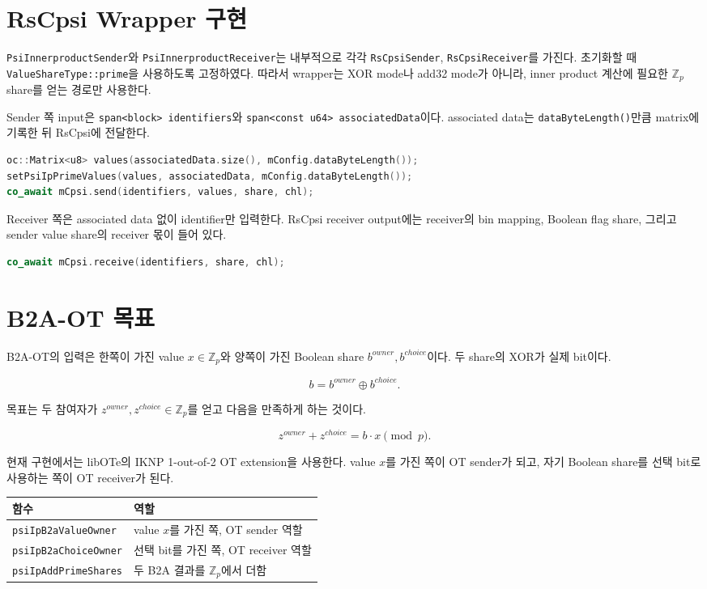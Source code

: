 \documentclass[11pt]{article}
\begin{document}
\section*{RsCpsi Wrapper 구현}

\texttt{PsiInnerproductSender}와 \texttt{PsiInnerproductReceiver}는 내부적으로
각각 \texttt{RsCpsiSender}, \texttt{RsCpsiReceiver}를 가진다. 초기화할 때
\texttt{ValueShareType::prime}을 사용하도록 고정하였다. 따라서 wrapper는 XOR mode나
add32 mode가 아니라, inner product 계산에 필요한 \(\mathbb{Z}_p\) share를 얻는
경로만 사용한다.

Sender 쪽 input은 \texttt{span<block> identifiers}와 \texttt{span<const u64>
associatedData}이다. associated data는 \texttt{dataByteLength()}만큼 matrix에
기록한 뒤 RsCpsi에 전달한다.

\begin{lstlisting}[language=C++]
oc::Matrix<u8> values(associatedData.size(), mConfig.dataByteLength());
setPsiIpPrimeValues(values, associatedData, mConfig.dataByteLength());
co_await mCpsi.send(identifiers, values, share, chl);
\end{lstlisting}

Receiver 쪽은 associated data 없이 identifier만 입력한다. RsCpsi receiver output에는
receiver의 bin mapping, Boolean flag share, 그리고 sender value share의 receiver 몫이
들어 있다.

\begin{lstlisting}[language=C++]
co_await mCpsi.receive(identifiers, share, chl);
\end{lstlisting}

\section*{B2A-OT 목표}

B2A-OT의 입력은 한쪽이 가진 value \(x\in\mathbb{Z}_p\)와 양쪽이 가진 Boolean
share \(b^{owner}, b^{choice}\)이다. 두 share의 XOR가 실제 bit이다.

\[
  b = b^{owner} \oplus b^{choice}.
\]

목표는 두 참여자가 \(z^{owner}, z^{choice}\in\mathbb{Z}_p\)를 얻고 다음을 만족하게
하는 것이다.

\[
  z^{owner} + z^{choice} = b\cdot x \pmod p.
\]

현재 구현에서는 libOTe의 IKNP 1-out-of-2 OT extension을 사용한다. value \(x\)를
가진 쪽이 OT sender가 되고, 자기 Boolean share를 선택 bit로 사용하는 쪽이 OT
receiver가 된다.

\begin{table}[h]
\centering
\begin{tabular}{ll}
\toprule
함수 & 역할 \\
\midrule
\texttt{psiIpB2aValueOwner} & value \(x\)를 가진 쪽, OT sender 역할 \\
\texttt{psiIpB2aChoiceOwner} & 선택 bit를 가진 쪽, OT receiver 역할 \\
\texttt{psiIpAddPrimeShares} & 두 B2A 결과를 \(\mathbb{Z}_p\)에서 더함 \\
\bottomrule
\end{tabular}
\end{table}
\end{document}
